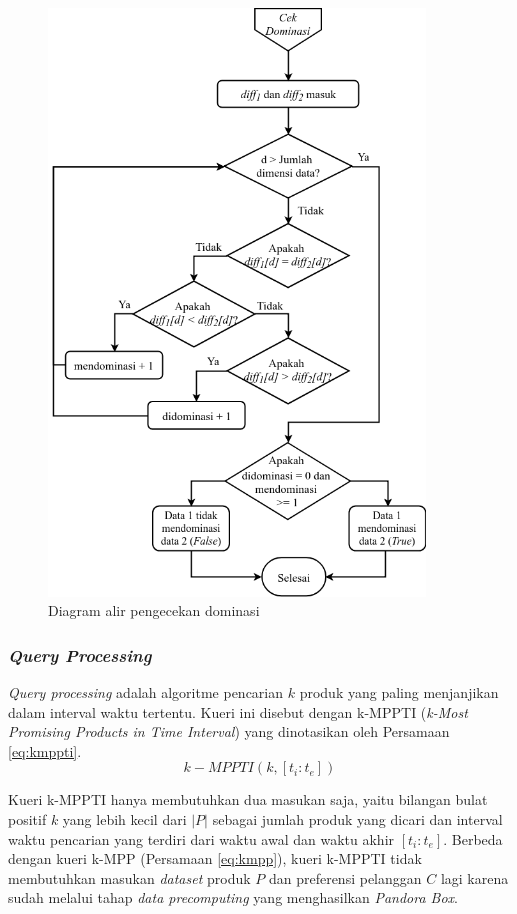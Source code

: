 \begin{figure}[H]
	\centering
	\includegraphics[width=10cm]{assets/img/bab3/flowchart-cek-dom.png}
	\caption{Diagram alir pengecekan dominasi}
	\label{fig:flowchart-cek-dom}
\end{figure}

\subsubsection{\textit{Query Processing}}
\tab \textit{Query processing} adalah algoritme pencarian $k$ produk yang paling menjanjikan dalam interval waktu tertentu. Kueri ini disebut dengan k-MPPTI (\textit{k-Most Promising Products in Time Interval}) yang dinotasikan oleh Persamaan \ref{eq:kmppti}. 
\begin{equation}\label{eq:kmppti}
k-MPPTI(k, [t_i:t_e])
\end{equation} 

Kueri k-MPPTI hanya membutuhkan dua masukan saja, yaitu bilangan bulat positif $k$ yang lebih kecil dari $|P|$ sebagai jumlah produk yang dicari dan interval waktu pencarian yang terdiri dari waktu awal dan waktu akhir $[t_i:t_e]$. Berbeda dengan kueri k-MPP (Persamaan \ref{eq:kmpp}), kueri k-MPPTI tidak membutuhkan masukan \textit{dataset} produk $P$ dan preferensi pelanggan $C$ lagi karena sudah melalui tahap \textit{data precomputing} yang menghasilkan \textit{Pandora Box}.

